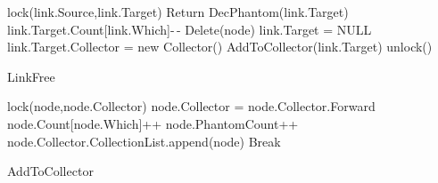 \begin{algorithm}[H]
	\scriptsize

	\begin{multicols}{2}
		\begin{algorithmic}[1]



\State lock(link.Source,link.Target)
\State Return
\EndIf
{}
\State DecPhantom(link.Target)
\Else
\State link.Target.Count[link.Which]-\,-
\State Delete(node)
\State link.Target = NULL
\Else
{}
\State link.Target.Collector = new Collector()
\EndIf
\State AddToCollector(link.Target)
\EndIf
\EndIf
\EndIf
\State unlock()

\EndProcedure

\caption{LinkFree}
\label{algorithm:linkfree}
\end{algorithmic}
\end{multicols}
\end{algorithm}


\setlength{\textfloatsep}{0pt}
\begin{algorithm}[H]
		\scriptsize
		
		\begin{multicols}{2}
			\begin{algorithmic}[1]
				



{}
\State lock(node,node.Collector)
\State node.Collector = node.Collector.Forward
\Else
\State node.Count[node.Which]++
\State node.PhantomCount++
\State node.Collector.CollectionList.append(node)
\State Break
\EndIf
{}
\EndWhile
\EndProcedure
\caption{AddToCollector}
\label{single:algorithm:addtocollector}
\end{algorithmic}
\end{multicols}
\end{algorithm}


